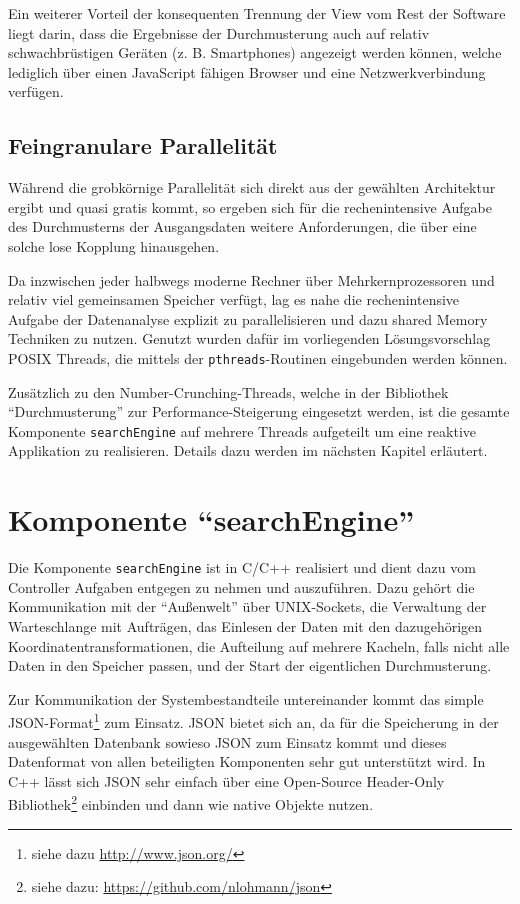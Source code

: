 \documentclass[10pt,a4paper]{report}
\begin{document}
Ein weiterer Vorteil der konsequenten Trennung der View vom Rest der Software liegt darin, dass die Ergebnisse der Durchmusterung auch auf relativ schwachbrüstigen Geräten (z. B. Smartphones) angezeigt werden können, welche lediglich über einen JavaScript fähigen Browser und eine Netzwerkverbindung verfügen.

\section{Feingranulare Parallelität}

Während die grobkörnige Parallelität sich direkt aus der gewählten Architektur ergibt und quasi gratis kommt, so ergeben sich für die rechenintensive Aufgabe des Durchmusterns der Ausgangsdaten weitere Anforderungen, die über eine solche lose Kopplung hinausgehen.

Da inzwischen jeder halbwegs moderne Rechner über Mehrkernprozessoren und relativ viel gemeinsamen Speicher verfügt, lag es nahe die rechenintensive Aufgabe der Datenanalyse explizit zu parallelisieren und dazu shared Memory Techniken zu nutzen. Genutzt wurden dafür im vorliegenden Lösungsvorschlag POSIX Threads, die mittels der \texttt{pthreads}-Routinen eingebunden werden können.

Zusätzlich zu den Number-Crunching-Threads, welche in der Bibliothek "`Durchmusterung"' zur Performance-Steigerung eingesetzt werden, ist die gesamte Komponente \texttt{searchEngine} auf mehrere Threads aufgeteilt um eine reaktive Applikation zu realisieren. Details dazu werden im nächsten Kapitel erläutert.


\chapter{Komponente "`searchEngine"'}

Die Komponente \texttt{searchEngine} ist in C/C++ realisiert und dient dazu vom Controller Aufgaben entgegen zu nehmen und auszuführen. Dazu gehört die Kommunikation mit der "`Außenwelt"' über UNIX-Sockets, die Verwaltung der Warteschlange mit Aufträgen, das Einlesen der Daten mit den dazugehörigen Koordinatentransformationen, die Aufteilung auf mehrere Kacheln, falls nicht alle Daten in den Speicher passen, und der Start der eigentlichen Durchmusterung.

Zur Kommunikation der Systembestandteile untereinander kommt das simple JSON-Format\footnote{siehe dazu \url{http://www.json.org/}} zum Einsatz. JSON bietet sich an, da für die Speicherung in der ausgewählten Datenbank sowieso JSON zum Einsatz kommt und dieses Datenformat von allen beteiligten Komponenten sehr gut unterstützt wird. In C++ lässt sich JSON sehr einfach über eine Open-Source Header-Only Bibliothek\footnote{siehe dazu: \url{https://github.com/nlohmann/json}} einbinden und dann wie native Objekte nutzen.
\end{document}
